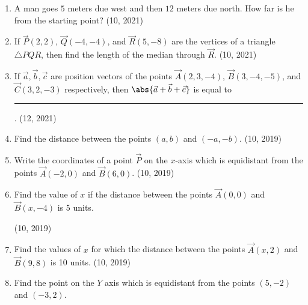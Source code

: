 \begin{enumerate}[label=\thesubsection.\arabic*, ref=\thesubsection.\theenumi]
	\item A man goes $5$ meters due west and then $12$ meters due north. How far is he from the starting point? \hfill (10, 2021)
		\item If $\vec{P}(2, 2)$, $\vec{Q}(-4, -4)$, and $\vec{R}(5, -8)$ are the vertices of a triangle $\triangle PQR$, then find the length of the median through $\vec{R}$. \hfill (10, 2021)
	\item If $\vec{a}, \vec{b}, \vec{c}$ are position vectors of the points $\vec{A}(2, 3, -4)$, $\vec{B}(3, -4, -5)$, and $\vec{C}(3, 2, -3)$ respectively, then $\abs{\vec{a}+\vec{b}+\vec{c}}$ is equal to
\rule{1cm}{0.2pt}.
	\hfill (12, 2021)
\item Find the distance between the points $(a, b)$ and $(-a, -b)$. \hfill (10, 2019)
\item Write the coordinates of a point $\vec{P}$ on the $x$-axis which is equidistant from the points $\vec{A}(-2, 0)$ and $\vec{B}(6, 0)$. \hfill (10, 2019)
\item Find the value of $x$ if the distance between the points $\vec{A}(0, 0)$ and $\vec{B}(x, -4)$ is 5 units.

	\hfill (10, 2019)
\item Find the values of $x$ for which the distance between the points $\vec{A}(x, 2)$ and $\vec{B}(9, 8)$ is 10 units. \hfill (10, 2019)
\item Find the point on the $Y$ axis which is equidistant from the points $(5, -2)$ and $(-3, 2)$.


\end{enumerate}
